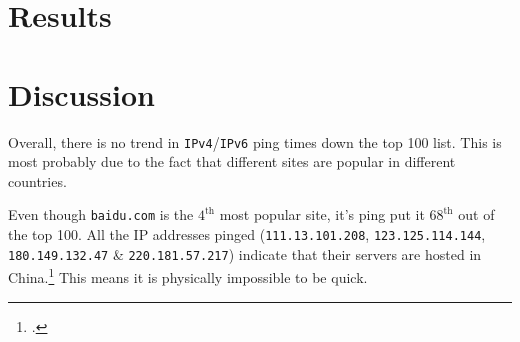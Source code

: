 \documentclass[a4paper]{article}
\def \IPF {\texttt{IPv4}}
\def \IPS {\texttt{IPv6}}
\begin{document}
\section{Results}



\section{Discussion}
Overall, there is no trend in {\IPF}/{\IPS} ping times down the top 100 list.
This is most probably due to the fact that different sites are popular in different countries.

Even though \texttt{baidu.com} is the $4^\textrm{th}$ most popular site, it's ping put it $68^\textrm{th}$ out of the top 100.
All the IP addresses pinged (\texttt{111.13.101.208}, \texttt{123.125.114.144}, \texttt{180.149.132.47} \& \texttt{220.181.57.217})
  indicate that their servers are hosted in China.\footcite{ip_location}
This means it is physically impossible to be quick.

\newpage
\printbibliography
\end{document}
